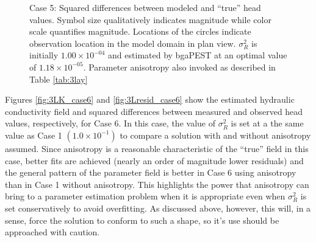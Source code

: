 \documentclass[11pt,oneside,onecolumn]{usgsreport}
\begin{document}
\begin{appendix}
\begin{figure}[!t]
\caption{\label{fig:3Lresid_case5}Case 5: Squared differences between modeled
and ``true'' head values. Symbol size qualitatively indicates magnitude
while color scale quantifies magnitude. Locations of the circles indicate
observation location in the model domain in plan view. $\sigma_{R}^{2}$ is initially $1.00\times10^{-04}$ and estimated by bgaPEST at an optimal value of $1.18\times10^{-05}$. Parameter anisotropy also invoked as described in Table \ref{tab:3lay}}
\end{figure}


Figures \ref{fig:3LK_case6} and \ref{fig:3Lresid_case6} show the
estimated hydraulic conductivity field and squared differences between
measured and observed head values, respectively, for Case 6. In this
case, the value of $\sigma_{R}^{2}$ is set at a the same value as
Case 1 $\left(1.0\times10^{-1}\right)$ to compare a solution with
and without anisotropy assumed. Since anisotropy is a reasonable characteristic
of the ``true'' field in this case, better fits are achieved (nearly
an order of magnitude lower residuals) and the general pattern of
the parameter field is better in Case 6 using anisotropy than in Case
1 without anisotropy. This highlights the power that anisotropy can
bring to a parameter estimation problem when it is appropriate even
when $\sigma_{R}^{2}$ is set conservatively to avoid overfitting.
As discussed above, however, this will, in a sense, force the solution
to conform to such a shape, so it's use should be approached with
caution.


\end{appendix}
\end{document}
